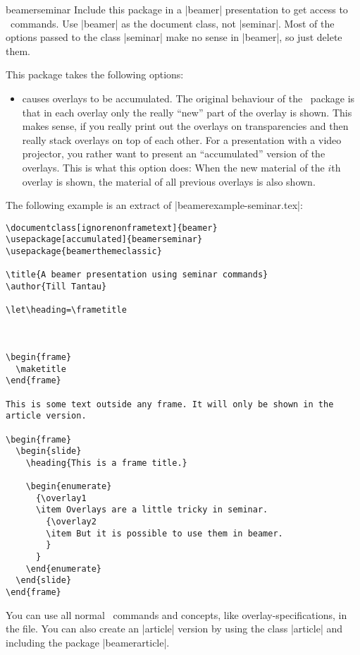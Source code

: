 \begin{package}{{beamerseminar}}
  Include this package in a |beamer| presentation to get access to \seminar\ commands. Use |beamer| as the document class, not |seminar|. Most of the options passed to the class |seminar| make no sense in |beamer|, so just delete them.

  This package takes the following options:
  \begin{itemize}
    \item
     causes overlays to be accumulated. The original behaviour of the \seminar\ package is that in each overlay only the really ``new'' part of the overlay is shown. This makes sense, if you really print out the overlays on transparencies and then really stack overlays on top of each other. For a presentation with a video projector, you rather want to present an ``accumulated'' version of the overlays. This is what this option does: When the new material of the $i$th overlay is shown, the material of all previous overlays is also shown.
  \end{itemize}

  \example
  The following example is an extract of |beamerexample-seminar.tex|:
\begin{verbatim}
\documentclass[ignorenonframetext]{beamer}
\usepackage[accumulated]{beamerseminar}
\usepackage{beamerthemeclassic}

\title{A beamer presentation using seminar commands}
\author{Till Tantau}

\let\heading=\frametitle



\begin{frame}
  \maketitle
\end{frame}

This is some text outside any frame. It will only be shown in the
article version.

\begin{frame}
  \begin{slide}
    \heading{This is a frame title.}

    \begin{enumerate}
      {\overlay1
      \item Overlays are a little tricky in seminar.
        {\overlay2
        \item But it is possible to use them in beamer.
        }
      }
    \end{enumerate}
  \end{slide}
\end{frame}

\end{verbatim}
  You can use all normal \beamer\ commands and concepts, like overlay-specifications, in the file. You can also create an |article| version by using the class |article| and including the package |beamerarticle|.
\end{package}

